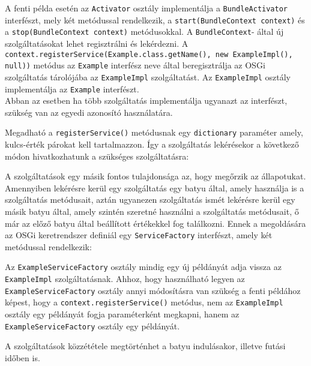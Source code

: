 A fenti példa esetén az \texttt{Activator} osztály implementálja a \texttt{BundleActivator} interfészt, mely két metódussal rendelkezik, a \texttt{start(BundleContext context)} és a \texttt{stop(BundleContext context)} metódusokkal. A \texttt{BundleContext}- által új szolgáltatásokat lehet regisztrálni és lekérdezni. A \texttt{context.registerService(Example.class.getName(), new ExampleImpl(), null))} metódus az \texttt{Example} interfész neve által beregisztrálja az OSGi szolgáltatás tárolójába az \texttt{ExampleImpl} szolgáltatást. Az \texttt{ExampleImpl} osztály implementálja az \texttt{Example} interfészt.
\\Abban az esetben ha több szolgáltatás implementálja ugyanazt az interfészt, szükség van az egyedi azonosító használatára.
\lstset{language=Java}

Megadható a \texttt{registerService()} metódusnak egy \texttt{dictionary} paraméter amely, kulcs-érték párokat kell tartalmazzon. Így a szolgáltatás lekérésekor a következő módon hivatkozhatunk a szükséges szolgáltatásra:
\lstset{language=Java}

A szolgáltatások egy másik fontos tulajdonsága az, hogy megőrzik az állapotukat. Amennyiben lekérésre kerül egy szolgáltatás egy batyu által, amely használja is a szolgáltatás metódusait, aztán ugyanezen szolgáltatás ismét lekérésre kerül egy másik batyu által, amely szintén szeretné használni a szolgáltatás metódusait, ő már az előző batyu által beállított értékekkel fog találkozni. Ennek a megoldására az OSGi keretrendszer definiál egy \texttt{ServiceFactory} interfészt, amely két metódussal rendelkezik:
\lstset{language=Java}

Az \texttt{ExampleServiceFactory} osztály mindig egy új példányát adja vissza az \texttt{ExampleImpl} szolgáltatásnak. Ahhoz, hogy használható legyen az \texttt{ExampleServiceFactory} osztály annyi módosításra van szükség a fenti példához képest, hogy a \texttt{context.registerService()} metódus, nem az \texttt{ExampleImpl} osztály egy példányát fogja paraméterként megkapni, hanem az \texttt{ExampleServiceFactory} osztály egy példányát.
\lstset{language=Java}

A szolgáltatások közzététele megtörténhet a batyu indulásakor, illetve futási időben is.